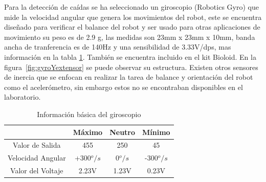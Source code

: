 Para la detecci\'on de ca\'idas se ha seleccionado un giroscopio (Robotics Gyro) que mide la velocidad angular que genera los movimientos del robot, este se encuentra diseñado para verificar el balance del robot y ser usado para otras aplicaciones de movimiento \cite{gyro}  su peso es de 2.9 g, las medidas son 23mm x 23mm x 10mm, banda ancha de tranferencia es de 140Hz y una sensibilidad de 3.33V/dps, mas informaci\'on en la tabla \ref{copio}. También se encuentra incluido en el kit Bioloid. En la figura~\ref{fig:gyroYextensor} se puede observar su estructura. Existen otros sensores de inercia que se enfocan en realizar la tarea de balance y orientaci\'on del robot como el aceler\'ometro, sin embargo estos no se encontraban disponibles en el laboratorio.



\begin{table}
\centering
\begin{tabular}{|c | c c c|}
\hline 
 & M\'aximo & Neutro & M\'inimo \\ 
\hline
Valor de Salida & 455 & 250 & 45 \\ 

Velocidad Angular & +300$^o/s$ & 0$^o/s$ & -300$^o/s$ \\ 
 
Valor del Voltaje & 2.23V & 1.23V & 0.23V \\ 
\hline 
\end{tabular} 
\caption{Informaci\'on b\'asica del giroscopio}
\label{copio}

\end{table}



